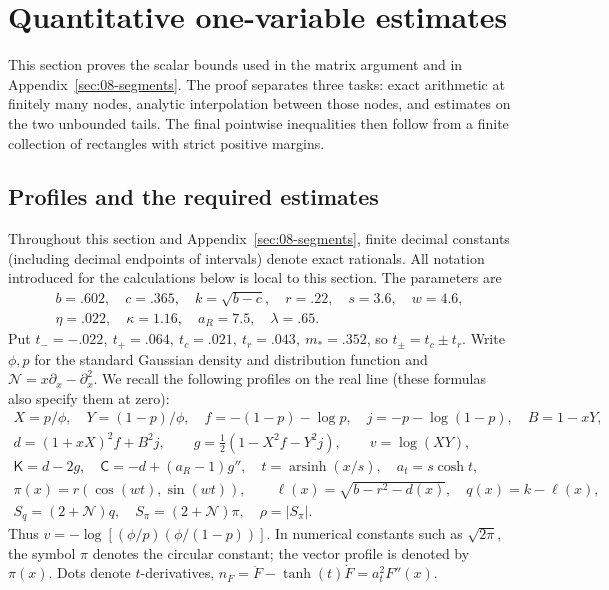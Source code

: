 \section{Quantitative one-variable estimates}\label{sec:07-scalar}

This section proves the scalar bounds used in the matrix argument and in
Appendix~\ref{sec:08-segments}. The proof separates three tasks: exact
arithmetic at finitely many nodes, analytic interpolation between those
nodes, and estimates on the two unbounded tails. The final pointwise
inequalities then follow from a finite collection of rectangles with
strict positive margins.

\subsection{Profiles and the required estimates}

Throughout this section and Appendix~\ref{sec:08-segments}, finite decimal constants (including decimal endpoints of intervals) denote exact rationals. All notation introduced for the calculations below is local to this section. The parameters are
\[
\begin{gathered}
 b=.602,\quad c=.365,\quad k=\sqrt{b-c},\quad r=.22,\quad s=3.6,\quad w=4.6,\\
 \eta=.022,\quad \kappa=1.16,\quad a_R=7.5,\quad \lambda=.65.
\end{gathered}
\]
Put \(t_-= -.022,\ t_+=.064,\ t_c=.021,\ t_r=.043,\ m_*=.352\), so \(t_\pm=t_c\pm t_r\). Write \(\phi,p\) for the standard Gaussian density and distribution function and \(\mathcal N=x\partial_x-\partial_x^2\). We recall the following profiles on the real line (these formulas also specify them at zero):
\[
\begin{aligned}
 X=p/\phi,\quad Y=(1-p)/\phi,\quad f=-(1-p)-\log p,\quad j=-p-\log(1-p),\quad B=1-xY,\\
 d=(1+xX)^2 f+B^2j,\qquad g=\tfrac12(1-X^2f-Y^2j),\qquad
 v=\log(XY),\\
 \mathsf K=d-2g,\quad \mathsf C=-d+(a_R-1)g'',\quad t=\operatorname{arsinh}(x/s),\quad a_t=s\cosh t,\\
 \pi(x)=r(\cos(wt),\sin(wt)),\qquad \ell(x)=\sqrt{b-r^2-d(x)},\quad q(x)=k-\ell(x),\\
 S_q=(2+\mathcal N)q,\quad S_\pi=(2+\mathcal N)\pi,\quad \rho=|S_\pi|.
\end{aligned}
\]
Thus \(v=-\log[(\phi/p)(\phi/(1-p))]\). In numerical constants such as \(\sqrt{2\pi}\), the symbol \(\pi\) denotes the circular constant; the vector profile is denoted by \(\pi(x)\). Dots denote \(t\)-derivatives, \(n_F=\ddot F-\tanh(t)\dot F=a_t^2 F''(x)\).


